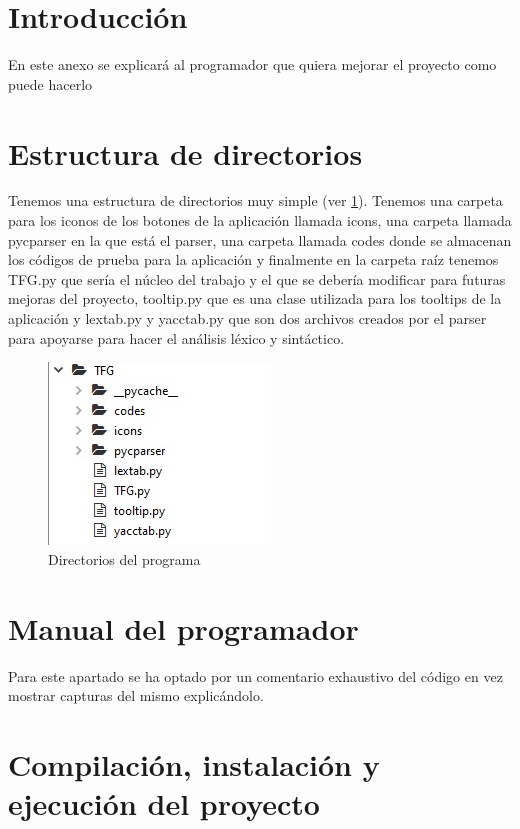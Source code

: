 
\section{Introducción}

En este anexo se explicará al programador que quiera mejorar el proyecto como puede hacerlo

\section{Estructura de directorios}

Tenemos una  estructura de directorios muy simple (ver \ref{fig:archivos}). Tenemos una carpeta para los iconos de los botones de la aplicación llamada icons, una carpeta llamada pycparser en la que está el parser, una carpeta llamada codes donde se almacenan los códigos de prueba para la aplicación y finalmente en la carpeta raíz tenemos TFG.py que sería el núcleo del trabajo y el que se debería modificar para futuras mejoras del proyecto, tooltip.py que es una clase utilizada para los tooltips de la aplicación y lextab.py y yacctab.py que son dos archivos creados por el parser para apoyarse para hacer el análisis léxico y sintáctico.

\begin{figure}
    \centering
    \includegraphics{img/directorios.jpg}
    \caption{Directorios del programa}
    \label{fig:archivos}
\end{figure}

\section{Manual del programador}

Para este apartado se ha optado por un comentario exhaustivo del código en vez mostrar capturas del mismo explicándolo.

\section{Compilación, instalación y ejecución del proyecto}

